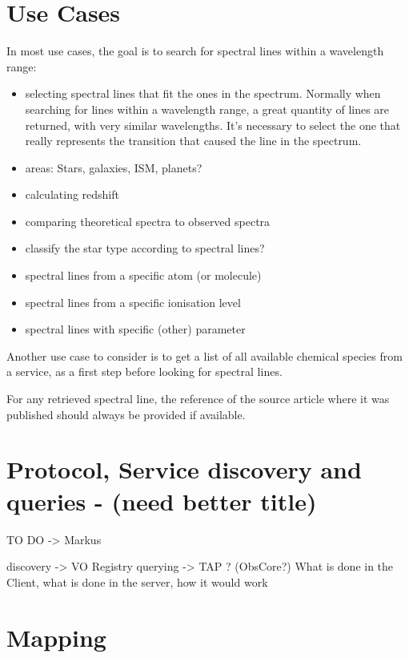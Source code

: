 \documentclass[11pt,a4paper]{ivoa}
\begin{document}
\section{Use Cases}

In most use cases, the goal is to search for spectral lines within a wavelength range:

\begin{itemize}

\item selecting  spectral lines that fit the ones in the spectrum.
Normally when searching for lines within a wavelength range, a great quantity of lines are returned, with very similar wavelengths. It's necessary to select the one that really represents the transition that caused the line in the spectrum.
\item areas: Stars, galaxies, ISM, planets?
\item calculating redshift
\item comparing theoretical spectra to observed spectra
\item classify the star type according to spectral lines?
\item spectral lines from a specific atom (or molecule)
\item spectral lines from a specific ionisation level
\item spectral lines with specific (other) parameter
\end{itemize}

Another use case to consider is to get a list of all available chemical species 
from a service, as a first step before looking for spectral lines.

For any retrieved spectral line, the reference of the source article where it was published
should always be provided if available.

\section{Protocol, Service discovery and queries - (need better title)}
TO DO -> Markus

discovery -> VO Registry
querying ->  TAP ? (ObsCore?)
What is done in the Client, what is done in the server, how it would work


\section{Mapping}
\end{document}
